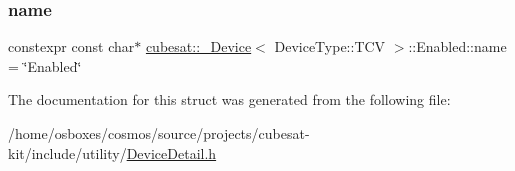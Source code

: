 \subsubsection{\texorpdfstring{name}{name}}
{\footnotesize\ttfamily constexpr const char$\ast$ \hyperlink{structcubesat_1_1__Device}{cubesat\+::\+\_\+\+Device}$<$ Device\+Type\+::\+T\+CV $>$\+::Enabled\+::name = \char`\"{}Enabled\char`\"{}\hspace{0.3cm}{\ttfamily [static]}}



The documentation for this struct was generated from the following file\+:\begin{DoxyCompactItemize}
\item 
/home/osboxes/cosmos/source/projects/cubesat-\/kit/include/utility/\hyperlink{DeviceDetail_8h}{Device\+Detail.\+h}\end{DoxyCompactItemize}
